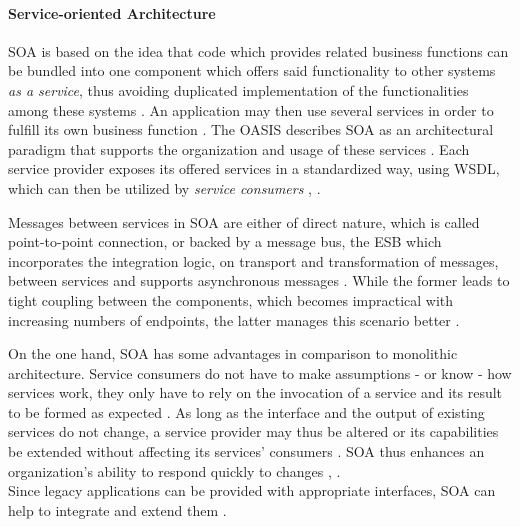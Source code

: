 
  \paragraph{Service-oriented Architecture} %
    \label{par:service_oriented_architecture}
    \ac{SOA} is based on the idea that code which provides related business functions can be bundled into one component which offers said functionality to other systems \emph{as a service}, thus avoiding duplicated implementation of the functionalities among these systems \cite[p.8]{Hohpe2004Enterprise}.
    An application may then use several services in order to fulfill its own business function \cite[p.~390]{Papazoglou2007Service}.
    The \ac{OASIS} describes \ac{SOA} as an architectural paradigm that supports the organization and usage of these services \cite{Standards2006Reference}. Each service provider exposes its offered services in a standardized way, \eg using \ac{WSDL}, which can then be utilized by \emph{service consumers} \cite[p.~390]{Papazoglou2007Service}, \cite[p.~17]{Strimbei2015Software}.

    Messages between services in \ac{SOA} are either of direct nature, which is called point-to-point connection, or backed by a message bus, the \ac{ESB} which incorporates the integration logic, \eg on transport and transformation of messages, between services and supports asynchronous messages \cite[p.~393]{Papazoglou2007Service}. While the former leads to tight coupling between the components, which becomes impractical with increasing numbers of endpoints, the latter manages this scenario better \cite[p.~393]{Papazoglou2007Service}.

    On the one hand, \ac{SOA} has some advantages in comparison to monolithic architecture.
    Service consumers do not have to make assumptions - or know - how services work, they only have to rely on the invocation of a service and its result to be formed as expected \cite[p.~390]{Papazoglou2007Service}. As long as the interface and the output of existing services do not change, a service provider may thus be altered or its capabilities be extended without affecting its services' consumers \cite[p.~390]{Papazoglou2007Service}. \ac{SOA} thus enhances an organization’s ability to respond quickly to changes \cite[p.~390]{Papazoglou2007Service}, \cite[p.~254]{Choi2010Implementing}. \\
    Since legacy applications can be provided with appropriate interfaces, SOA can help to integrate and extend them \cite[p.~390]{Papazoglou2007Service}.

